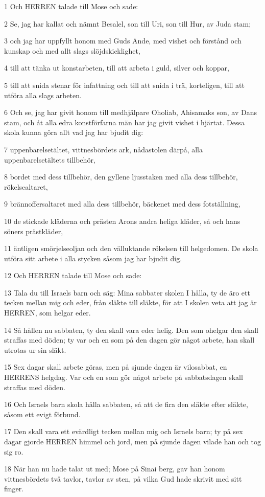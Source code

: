 \par 1 Och HERREN talade till Mose och sade:
\par 2 Se, jag har kallat och nämnt Besalel, son till Uri, son till Hur, av Juda stam;
\par 3 och jag har uppfyllt honom med Guds Ande, med vishet och förstånd och kunskap och med allt slags slöjdskicklighet,
\par 4 till att tänka ut konstarbeten, till att arbeta i guld, silver och koppar,
\par 5 till att snida stenar för infattning och till att snida i trä, korteligen, till att utföra alla slags arbeten.
\par 6 Och se, jag har givit honom till medhjälpare Oholiab, Ahisamaks son, av Dans stam, och åt alla edra konstförfarna män har jag givit vishet i hjärtat. Dessa skola kunna göra allt vad jag har bjudit dig:
\par 7 uppenbarelsetältet, vittnesbördets ark, nådastolen därpå, alla uppenbarelsetältets tillbehör,
\par 8 bordet med dess tillbehör, den gyllene ljusstaken med alla dess tillbehör, rökelsealtaret,
\par 9 brännoffersaltaret med alla dess tillbehör, bäckenet med dess fotställning,
\par 10 de stickade kläderna och prästen Arons andra heliga kläder, så och hans söners prästkläder,
\par 11 äntligen smörjelseoljan och den välluktande rökelsen till helgedomen. De skola utföra sitt arbete i alla stycken såsom jag har bjudit dig.
\par 12 Och HERREN talade till Mose och sade:
\par 13 Tala du till Israels barn och säg: Mina sabbater skolen I hålla, ty de äro ett tecken mellan mig och eder, från släkte till släkte, för att I skolen veta att jag är HERREN, som helgar eder.
\par 14 Så hållen nu sabbaten, ty den skall vara eder helig. Den som ohelgar den skall straffas med döden; ty var och en som på den dagen gör något arbete, han skall utrotas ur sin släkt.
\par 15 Sex dagar skall arbete göras, men på sjunde dagen är vilosabbat, en HERRENS helgdag. Var och en som gör något arbete på sabbatsdagen skall straffas med döden.
\par 16 Och Israels barn skola hålla sabbaten, så att de fira den släkte efter släkte, såsom ett evigt förbund.
\par 17 Den skall vara ett evärdligt tecken mellan mig och Israels barn; ty på sex dagar gjorde HERREN himmel och jord, men på sjunde dagen vilade han och tog sig ro.
\par 18 När han nu hade talat ut med; Mose på Sinai berg, gav han honom vittnesbördets två tavlor, tavlor av sten, på vilka Gud hade skrivit med sitt finger.

